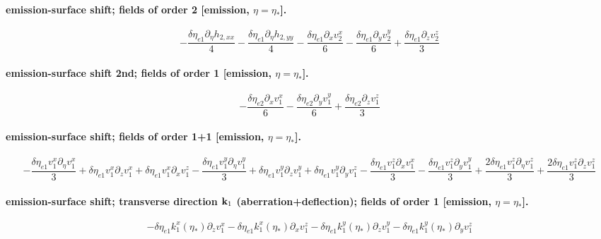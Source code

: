 \paragraph{emission-surface shift; fields of order 2 [emission, $\eta=\eta_*$].}
\begin{dmath*}- \frac{\delta\eta_{e1} \partial_\eta  h_{2,xx}}{4} - \frac{\delta\eta_{e1} \partial_\eta  h_{2,yy}}{4} - \frac{\delta\eta_{e1} \partial_x  {v^{x}_{2}}}{6} - \frac{\delta\eta_{e1} \partial_y  {v^{y}_{2}}}{6} + \frac{\delta\eta_{e1} \partial_z  {v^{z}_{2}}}{3}\end{dmath*}
\paragraph{emission-surface shift 2nd; fields of order 1 [emission, $\eta=\eta_*$].}
\begin{dmath*}- \frac{\delta\eta_{e2} \partial_x  {v^{x}_{1}}}{6} - \frac{\delta\eta_{e2} \partial_y  {v^{y}_{1}}}{6} + \frac{\delta\eta_{e2} \partial_z  {v^{z}_{1}}}{3}\end{dmath*}
\paragraph{emission-surface shift; fields of order 1{+}1 [emission, $\eta=\eta_*$].}
\begin{dmath*}- \frac{\delta\eta_{e1} {v^{x}_{1}} \partial_\eta  {v^{x}_{1}}}{3} + \delta\eta_{e1} {v^{x}_{1}} \partial_z  {v^{x}_{1}} + \delta\eta_{e1} {v^{x}_{1}} \partial_x  {v^{z}_{1}} - \frac{\delta\eta_{e1} {v^{y}_{1}} \partial_\eta  {v^{y}_{1}}}{3} + \delta\eta_{e1} {v^{y}_{1}} \partial_z  {v^{y}_{1}} + \delta\eta_{e1} {v^{y}_{1}} \partial_y  {v^{z}_{1}} - \frac{\delta\eta_{e1} {v^{z}_{1}} \partial_x  {v^{x}_{1}}}{3} - \frac{\delta\eta_{e1} {v^{z}_{1}} \partial_y  {v^{y}_{1}}}{3} + \frac{2 \delta\eta_{e1} {v^{z}_{1}} \partial_\eta  {v^{z}_{1}}}{3} + \frac{2 \delta\eta_{e1} {v^{z}_{1}} \partial_z  {v^{z}_{1}}}{3}\end{dmath*}
\paragraph{emission-surface shift; transverse direction $\mathbf k_1$ (aberration+deflection); fields of order 1 [emission, $\eta=\eta_*$].}
\begin{dmath*}- \delta\eta_{e1} {k^{x}_{1}}(\eta_*) \partial_z  {v^{x}_{1}} - \delta\eta_{e1} {k^{x}_{1}}(\eta_*) \partial_x  {v^{z}_{1}} - \delta\eta_{e1} {k^{y}_{1}}(\eta_*) \partial_z  {v^{y}_{1}} - \delta\eta_{e1} {k^{y}_{1}}(\eta_*) \partial_y  {v^{z}_{1}}\end{dmath*}
